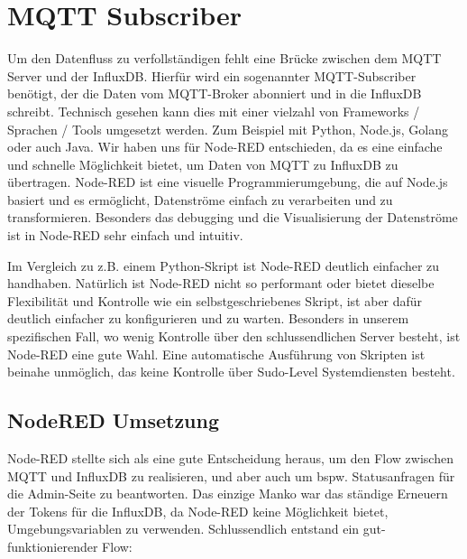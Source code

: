 \section{MQTT Subscriber}
Um den Datenfluss zu verfollständigen fehlt eine Brücke zwischen dem MQTT Server und der InfluxDB. 
Hierfür wird ein sogenannter MQTT-Subscriber benötigt, der die Daten vom MQTT-Broker abonniert und in die InfluxDB schreibt.
Technisch gesehen kann dies mit einer vielzahl von Frameworks / Sprachen / Tools umgesetzt werden. 
Zum Beispiel mit Python, Node.js, Golang oder auch Java.
Wir haben uns für Node-RED entschieden, da es eine einfache und schnelle Möglichkeit bietet, um Daten von MQTT zu InfluxDB zu übertragen.
Node-RED ist eine visuelle Programmierumgebung, die auf Node.js basiert und es ermöglicht, Datenströme einfach zu verarbeiten und zu transformieren.
Besonders das debugging und die Visualisierung der Datenströme ist in Node-RED sehr einfach und intuitiv.
\cite{nodered2023docs}

Im Vergleich zu z.B. einem Python-Skript ist Node-RED deutlich einfacher zu handhaben.
Natürlich ist Node-RED nicht so performant oder bietet dieselbe Flexibilität und Kontrolle wie ein selbstgeschriebenes Skript,
ist aber dafür deutlich einfacher zu konfigurieren und zu warten.
Besonders in unserem spezifischen Fall, wo wenig Kontrolle über den schlussendlichen Server besteht, ist Node-RED eine gute Wahl.
Eine automatische Ausführung von Skripten ist beinahe unmöglich, das keine Kontrolle über Sudo-Level Systemdiensten besteht.

\subsection{NodeRED Umsetzung}
Node-RED stellte sich als eine gute Entscheidung heraus, um den Flow zwischen MQTT und InfluxDB zu realisieren, und aber auch um bspw. Statusanfragen für die Admin-Seite zu beantworten.
Das einzige Manko war das ständige Erneuern der Tokens für die InfluxDB, da Node-RED keine Möglichkeit bietet, Umgebungsvariablen zu verwenden.
Schlussendlich entstand ein gut-funktionierender Flow:
\begin{center}
\end{center}


